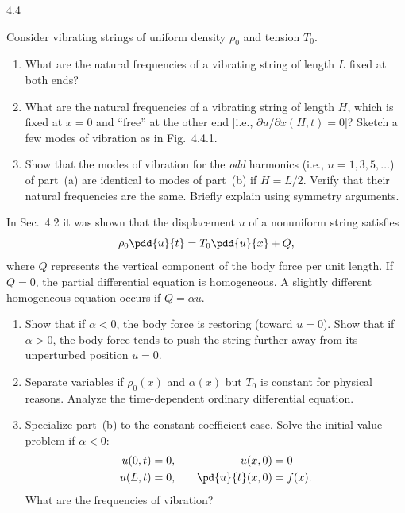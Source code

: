 \begin{exercises}{4.4}

\item Consider vibrating strings of uniform density $\rho_0$ and tension $T_0$.

\begin{enumerate}
\item[(a)]\starred What are the natural frequencies of a vibrating string of length $L$ fixed at both ends?

\item[(b)]\starred What are the natural frequencies of a vibrating string of length $H$, which is fixed at $x = 0$ and ``free'' at the other end [i.e., $\partial u/\partial x(H,t) = 0$]?  Sketch a few modes of vibration as in Fig.~4.4.1.

\item[(c)] Show that the modes of vibration for the \emph{odd} harmonics (i.e., $n = 1,3,5,\ldots$) of part~(a) are identical to modes of part~(b) if $H = L/2$.  Verify that their natural frequencies are the same.  Briefly explain using symmetry arguments.
\end{enumerate}

\item In Sec.~4.2 it was shown that the displacement $u$ of a nonuniform string satisfies
\[
\rho_0\pdd{u}{t} = T_0\pdd{u}{x} + Q,
\]
where $Q$ represents the vertical component of the body force per unit length.  If $Q = 0$, the partial differential equation is homogeneous.  A slightly different homogeneous equation occurs if $Q = \alpha u$.

\begin{enumerate}
\item[(a)] Show that if $\alpha < 0$, the body force is restoring (toward $u = 0$).  Show that if $\alpha > 0$, the body force tends to push the string further away from its unperturbed position $u = 0$.

\item[(b)] Separate variables if $\rho_0(x)$ and $\alpha(x)$ but $T_0$ is constant for physical reasons.  Analyze the time-dependent ordinary differential equation.

\item[(c)]\starred Specialize part~(b) to the constant coefficient case.  Solve the initial value problem if $\alpha < 0$:
\begin{align*}
u(0,t) &= 0, &\quad u(x,0) &= 0 \\
u(L,t) &= 0, &\quad \pd{u}{t}(x,0) &= f(x).
\end{align*}
What are the frequencies of vibration?
\end{enumerate}


\end{exercises}
